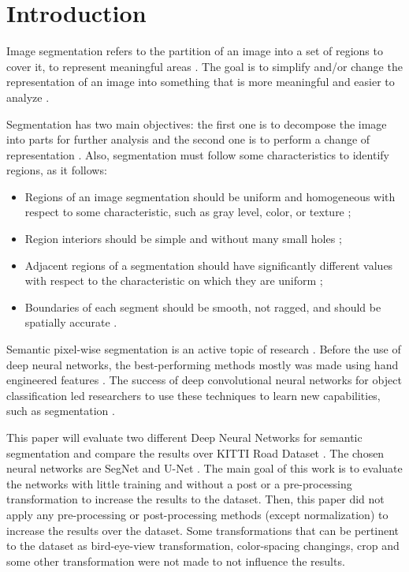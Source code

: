 \documentclass[10pt,twocolumn,letterpaper]{article}
\begin{document}

\section{Introduction} \label{introduction}

Image segmentation refers to the partition of an image into a set of regions to cover it, to represent meaningful areas \cite{DOMINGUEZ}. The goal is to simplify and/or change the representation of an image into something that is more meaningful and easier to analyze \cite{AHMED_SARMA}.

Segmentation has two main objectives: the first one is to decompose the image into parts for further analysis and the second one is to perform a change of representation \cite{DOMINGUEZ}. Also, segmentation must follow some characteristics to identify regions, as it follows:

\begin{itemize}
 \item Regions of an image segmentation should be uniform and homogeneous with respect to some characteristic, such as gray level, color, or texture \cite{DOMINGUEZ};
 \item Region interiors should be simple and without many small holes \cite{DOMINGUEZ};
 \item Adjacent regions of a segmentation should have significantly different values with respect to the characteristic on which they are uniform \cite{DOMINGUEZ};
 \item Boundaries of each segment should be smooth, not ragged, and should be spatially accurate \cite{DOMINGUEZ}.
\end{itemize}

Semantic pixel-wise segmentation is an active topic of research \cite{SEGNET}. Before the use of deep neural networks, the best-performing methods mostly was made using hand engineered features \cite{SEGNET}. The success of deep convolutional neural networks for object classification led researchers to use these techniques to learn new capabilities, such as segmentation \cite{SEGNET}.

This paper will evaluate two different Deep Neural Networks for semantic segmentation and compare the results over KITTI Road Dataset \cite{KITTI}. The chosen neural networks are SegNet \cite{SEGNET} and U-Net \cite{UNET}. The main goal of this work is to evaluate the networks with little training and without a post or a pre-processing transformation to increase the results to the dataset. Then, this paper did not apply any pre-processing or post-processing methods (except normalization) to increase the results over the dataset. Some transformations that can be pertinent to the dataset as bird-eye-view transformation, color-spacing changings, crop and some other transformation were not made to not influence the results.
\end{document}
